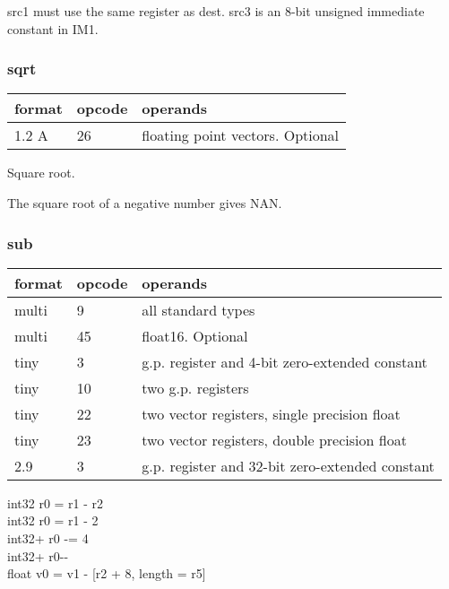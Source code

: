 \documentclass[forwardcom.tex]{subfiles}
\begin{document}
src1 must use the same register as dest. src3 is an 8-bit unsigned immediate constant in IM1.
\vspace{2mm}

\subsubsection{sqrt}
\label{table:sqrtInstruction}
\begin{tabular}{|p{12mm}|p{12mm}|p{110mm}|}
\hline
\bfseries format & \bfseries opcode & \bfseries operands \\ \hline
1.2 A & 26 & floating point vectors. Optional \\ \hline
\end{tabular}
\vspace{2mm}

Square root.
\vspace{2mm}

The square root of a negative number gives NAN.

\subsubsection{sub}
\label{table:subInstruction}
\begin{tabular}{|p{12mm}|p{12mm}|p{110mm}|}
\hline
\bfseries format & \bfseries opcode & \bfseries operands \\ \hline
multi &  9 & all standard types \\ \hline
multi & 45 & float16. Optional \\ \hline
tiny  &  3 & g.p. register and 4-bit zero-extended constant \\ \hline
tiny  & 10 & two g.p. registers \\ \hline
tiny  & 22 & two vector registers, single precision float \\ \hline
tiny  & 23 & two vector registers, double precision float \\ \hline
2.9   &  3 & g.p. register and 32-bit zero-extended constant \\ \hline
\end{tabular}
\vspace{2mm}

int32 r0 = r1 - r2 \\
int32 r0 = r1 - 2 \\
int32+ r0 -= 4 \\
int32+ r0-{-} \\
float v0 = v1 - [r2 + 8, length = r5]
\vspace{2mm}
\end{document}
